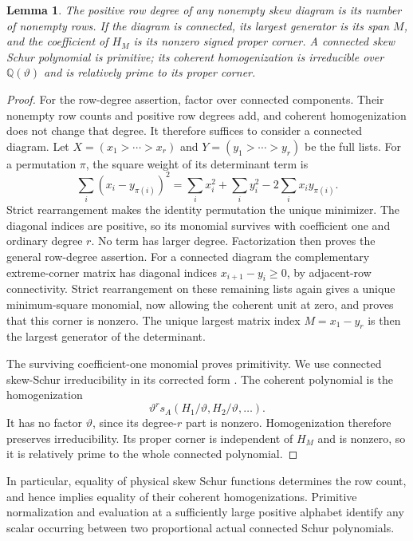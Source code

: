 \documentclass[11pt,a4paper]{amsart}
\numberwithin{equation}{section}
\theoremstyle{plain}
\newtheorem{lemma}[theorem]{Lemma}
\theoremstyle{definition}
\newcommand{\Q}{\mathbb Q}
\begin{document}
\begin{lemma}\label{sc:row-degree}
The positive row degree of any nonempty skew diagram is its number of
nonempty rows.  If the diagram is connected, its largest generator is
its span \(M\), and the coefficient of \(H_M\) is its nonzero signed
proper corner.  A connected skew Schur polynomial is primitive; its
coherent homogenization is irreducible over \(\Q(\vartheta)\) and
is relatively prime to its proper corner.
\end{lemma}
\begin{proof}
For the row-degree assertion, factor over connected components.
Their nonempty row counts and positive row degrees add, and coherent
homogenization does not change that degree.  It therefore suffices
to consider a connected diagram.
Let \(X=(x_1>\cdots>x_r)\) and \(Y=(y_1>\cdots>y_r)\) be the full
lists.  For a permutation \(\pi\), the square weight of its determinant
term is
\[
 \sum_i(x_i-y_{\pi(i)})^2
 =\sum_i x_i^2+\sum_i y_i^2-2\sum_i x_i y_{\pi(i)}.
\]
Strict rearrangement makes the identity permutation the unique
minimizer.  The diagonal indices are positive, so its monomial survives
with coefficient one and ordinary degree \(r\).  No term has larger
degree.  Factorization then proves the general row-degree assertion.
For a connected diagram the complementary extreme-corner matrix has
diagonal indices \(x_{i+1}-y_i\ge0\), by adjacent-row connectivity.
Strict rearrangement on these remaining lists again gives a unique
minimum-square monomial, now allowing the coherent unit at zero,
and proves that this corner is nonzero.  The unique largest matrix
index \(M=x_1-y_r\) is then the largest generator of the determinant.

The surviving coefficient-one monomial proves primitivity.  We use
connected skew-Schur irreducibility in its corrected form
\cite{Barekat2009CoincidencesCorrigendum}.
The coherent polynomial is the homogenization
\[
 \vartheta^r s_A(H_1/\vartheta,H_2/\vartheta,\ldots).
\]
It has no factor \(\vartheta\), since its degree-\(r\) part is nonzero.  Homogenization therefore preserves
irreducibility.  Its proper corner is independent of \(H_M\) and is
nonzero, so it is relatively prime to the whole connected polynomial.
\end{proof}

In particular, equality of physical skew Schur functions determines
the row count, and hence implies equality of their coherent
homogenizations.  Primitive normalization and evaluation at a
sufficiently large positive alphabet identify any scalar occurring
between two proportional actual connected Schur polynomials.
\end{document}
